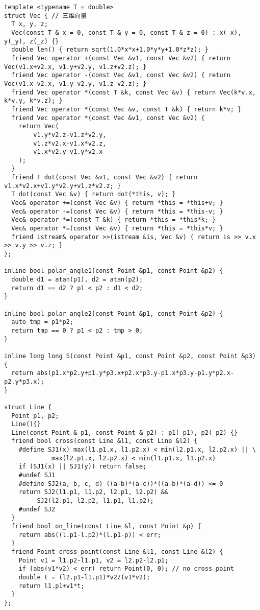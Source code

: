 \documentclass[UTF8]{ctexart}
\begin{document}
{{{{{{{{{{{{\begin{lstlisting}
template <typename T = double>
struct Vec { // 三维向量
  T x, y, z;
  Vec(const T &_x = 0, const T &_y = 0, const T &_z = 0) : x(_x), y(_y), z(_z) {}
  double len() { return sqrt(1.0*x*x+1.0*y*y+1.0*z*z); }
  friend Vec operator +(const Vec &v1, const Vec &v2) { return Vec(v1.x+v2.x, v1.y+v2.y, v1.z+v2.z); }
  friend Vec operator -(const Vec &v1, const Vec &v2) { return Vec(v1.x-v2.x, v1.y-v2.y, v1.z-v2.z); }
  friend Vec operator *(const T &k, const Vec &v) { return Vec(k*v.x, k*v.y, k*v.z); }
  friend Vec operator *(const Vec &v, const T &k) { return k*v; }
  friend Vec operator *(const Vec &v1, const Vec &v2) {
    return Vec(
        v1.y*v2.z-v1.z*v2.y,
        v1.z*v2.x-v1.x*v2.z,
        v1.x*v2.y-v1.y*v2.x
    );
  }
  friend T dot(const Vec &v1, const Vec &v2) { return v1.x*v2.x+v1.y*v2.y+v1.z*v2.z; }
  T dot(const Vec &v) { return dot(*this, v); }
  Vec& operator +=(const Vec &v) { return *this = *this+v; }
  Vec& operator -=(const Vec &v) { return *this = *this-v; }
  Vec& operator *=(const T &k) { return *this = *this*k; }
  Vec& operator *=(const Vec &v) { return *this = *this*v; }
  friend istream& operator >>(istream &is, Vec &v) { return is >> v.x >> v.y >> v.z; }
};

inline bool polar_angle1(const Point &p1, const Point &p2) {
  double d1 = atan(p1), d2 = atan(p2); 
  return d1 == d2 ? p1 < p2 : d1 < d2;
}

inline bool polar_angle2(const Point &p1, const Point &p2) {
  auto tmp = p1*p2;
  return tmp == 0 ? p1 < p2 : tmp > 0;
}

inline long long S(const Point &p1, const Point &p2, const Point &p3) {
  return abs(p1.x*p2.y+p1.y*p3.x+p2.x*p3.y-p1.x*p3.y-p1.y*p2.x-p2.y*p3.x);
}

struct Line {
  Point p1, p2;
  Line(){}
  Line(const Point &_p1, const Point &_p2) : p1(_p1), p2(_p2) {}
  friend bool cross(const Line &l1, const Line &l2) {
    #define SJ1(x) max(l1.p1.x, l1.p2.x) < min(l2.p1.x, l2.p2.x) || \
             max(l2.p1.x, l2.p2.x) < min(l1.p1.x, l1.p2.x)
    if (SJ1(x) || SJ1(y)) return false;
    #undef SJ1
    #define SJ2(a, b, c, d) ((a-b)*(a-c))*((a-b)*(a-d)) <= 0
    return SJ2(l1.p1, l1.p2, l2.p1, l2.p2) &&
         SJ2(l2.p1, l2.p2, l1.p1, l1.p2);
    #undef SJ2
  }
  friend bool on_line(const Line &l, const Point &p) {
    return abs((l.p1-l.p2)*(l.p1-p)) < err;
  }
  friend Point cross_point(const Line &l1, const Line &l2) {
    Point v1 = l1.p2-l1.p1, v2 = l2.p2-l2.p1;
    if (abs(v1*v2) < err) return Point(0, 0); // no cross_point
    double t = (l2.p1-l1.p1)*v2/(v1*v2);
    return l1.p1+v1*t;
  }
};


\end{lstlisting}}}}}}}}}}}}}
\end{document}

